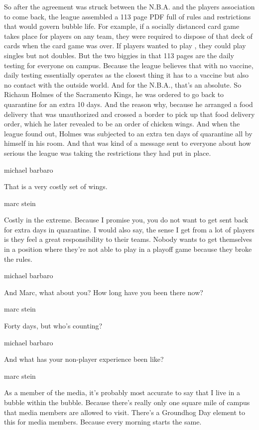 So after the agreement was struck between the N.B.A. and the players
association to come back, the league assembled a 113 page PDF full of
rules and restrictions that would govern bubble life. For example, if a
socially distanced card game takes place for players on any team, they
were required to dispose of that deck of cards when the card game was
over. If players wanted to play , they could play singles but not
doubles. But the two biggies in that 113 pages are the daily testing for
everyone on campus. Because the league believes that with no vaccine,
daily testing essentially operates as the closest thing it has to a
vaccine but also no contact with the outside world. And for the N.B.A.,
that's an absolute. So Richaun Holmes of the Sacramento Kings, he was
ordered to go back to quarantine for an extra 10 days. And the reason
why, because he arranged a food delivery that was unauthorized and
crossed a border to pick up that food delivery order, which he later
revealed to be an order of chicken wings. And when the league found out,
Holmes was subjected to an extra ten days of quarantine all by himself
in his room. And that was kind of a message sent to everyone about how
serious the league was taking the restrictions they had put in place.

michael barbaro

That is a very costly set of wings.

marc stein

Costly in the extreme. Because I promise you, you do not want to get
sent back for extra days in quarantine. I would also say, the sense I
get from a lot of players is they feel a great responsibility to their
teams. Nobody wants to get themselves in a position where they're not
able to play in a playoff game because they broke the rules.

michael barbaro

And Marc, what about you? How long have you been there now?

marc stein

Forty days, but who's counting?

michael barbaro

And what has your non-player experience been like?

marc stein

As a member of the media, it's probably most accurate to say that I live
in a bubble within the bubble. Because there's really only one square
mile of campus that media members are allowed to visit. There's a
Groundhog Day element to this for media members. Because every morning
starts the same.

